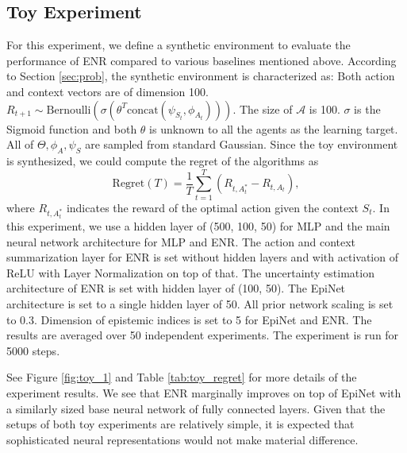 \subsection{Toy Experiment}
For this experiment, we define a synthetic environment to evaluate the performance of ENR compared to various baselines mentioned above. According to Section \ref{sec:prob}, the synthetic environment is characterized as: Both action and context vectors are of dimension 100. $R_{t+1} \sim \text{Bernoulli}\left(\sigma(\theta^T\text{concat}(\psi_{S_t}, \phi_{A_t}))\right)$. The size of $\mathcal{A}$ is 100. $\sigma$ is the Sigmoid function and both $\theta$ is unknown to all the agents as the learning target. All of $\Theta, \phi_A, \psi_S$ are sampled from standard Gaussian. Since the toy environment is synthesized, we could compute the regret of the algorithms as
\begin{equation}
    \text{Regret}(T) = \frac{1}{T}\sum_{t=1}^T (R_{t, A^*_t} - R_{t, A_t}),
\end{equation}
where $R_{t, A^*_t}$ indicates the reward of the optimal action given the context $S_t$. In this experiment, we use a hidden layer of (500, 100, 50) for MLP and the main neural network architecture for MLP and ENR. The action and context summarization layer for ENR is set without hidden layers and with activation of ReLU with Layer Normalization on top of that. The uncertainty estimation architecture of ENR is set with hidden layer of (100, 50). The EpiNet architecture is set to a single hidden layer of 50. All prior network scaling is set to 0.3. Dimension of epistemic indices is set to 5 for EpiNet and ENR. The results are averaged over 50 independent experiments. The experiment is run for 5000 steps.

See Figure \ref{fig:toy_1} and Table \ref{tab:toy_regret} for more details of the experiment results. We see that ENR marginally improves on top of EpiNet with a similarly sized base neural network of fully connected layers. Given that the setups of both toy experiments are relatively simple, it is expected that sophisticated neural representations would not make material difference.  

